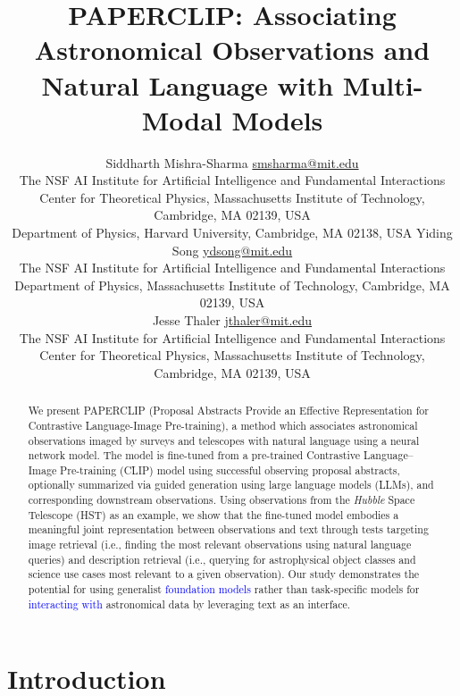 \documentclass[10pt]{article} %
\title{\textsc{PAPERCLIP}: Associating Astronomical Observations and Natural Language with Multi-Modal Models}
\author{\name Siddharth Mishra-Sharma \email \href{mailto:smsharma@mit.edu}{smsharma@mit.edu} \\
      \addr The NSF AI Institute for Artificial Intelligence and Fundamental Interactions\\
      Center for Theoretical Physics, Massachusetts Institute of Technology, Cambridge, MA 02139, USA \\
      Department of Physics, Harvard University, Cambridge, MA 02138, USA
      \AND
      \name Yiding Song \email \href{mailto:ydsong@mit.edu}{ydsong@mit.edu} \\
      \addr The NSF AI Institute for Artificial Intelligence and Fundamental Interactions\\
      Department of Physics, Massachusetts Institute of Technology, Cambridge, MA 02139, USA \\
      \AND
      \name Jesse Thaler \email \href{mailto:jthaler@mit.edu}{jthaler@mit.edu} \\
      \addr The NSF AI Institute for Artificial Intelligence and Fundamental Interactions\\
      Center for Theoretical Physics, Massachusetts Institute of Technology, Cambridge, MA 02139, USA \\
}
\newcommand{\githubmaster}{\href{https://github.com/smsharma/HubbleCLIP}{\faGithub}\xspace}
\newcommand{\hubble}{\emph{Hubble}\xspace}
\newcommand{\SM}[1]{\textcolor{blue}{[SM: #1]}}
\newcommand{\changes}[1]{\textcolor{blue}{#1}}
\begin{document}
\maketitle

\thispagestyle{firstpage}

\begin{abstract}
We present PAPERCLIP (Proposal Abstracts Provide an Effective Representation for Contrastive Language-Image Pre-training), a method which associates astronomical observations imaged by surveys and telescopes with natural language  using a neural network model. The model is fine-tuned from a pre-trained Contrastive Language–Image Pre-training (CLIP) model using successful observing proposal abstracts, optionally summarized via guided generation using large language models (LLMs), and corresponding downstream observations. Using observations from the \hubble Space Telescope (HST) as an example, we show that the fine-tuned model embodies a meaningful joint representation between observations and text through tests targeting image retrieval (i.e., finding the most relevant observations using natural language queries) and description retrieval (i.e., querying for astrophysical object classes and science use cases most relevant to a given observation). Our study demonstrates the potential for using generalist \changes{foundation models} rather than task-specific models for \changes{interacting with} astronomical data by leveraging text as an interface. \githubmaster
\end{abstract}

\tableofcontents

\section{Introduction}
\label{sec:intro}

\end{document}
